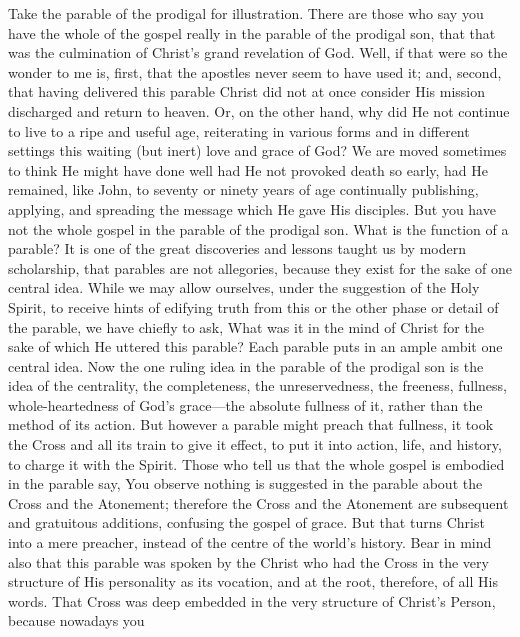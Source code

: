 \documentclass[12pt,a5paper,twoside,titlepage]{book}
\begin{document}
Take the parable of the prodigal for illustration. 
There are those who say you have the 
whole of the gospel really in the parable of the 
prodigal son, that that was the culmination of 
Christ's grand revelation of God. Well, if that 
were so the wonder to me is, first, that the 
apostles never seem to have used it; and, second, 
that having delivered this parable Christ did 
not at once consider His mission discharged and 
return to heaven. Or, on the other hand, why 
did He not continue to live to a ripe and useful 
age, reiterating in various forms and in different 
settings this waiting (but inert) love and grace 
of God? We are moved sometimes to think He 
might have done well had He not provoked 
death so early, had He remained, like John, to 
seventy or ninety years of age continually 
publishing, applying, and spreading the message 
which He gave His disciples. But you have not 
the whole gospel in the parable of the prodigal 
son. What is the function of a parable? It is 
one of the great discoveries and lessons taught 
us by modern scholarship, that parables are not 
allegories, because they exist for the sake of 
one central idea. While we may allow ourselves, 
under the suggestion of the Holy Spirit, 
to receive hints of edifying truth from this or 
the other phase or detail of the parable, we 
have chiefly to ask, What was it in the mind of 
Christ for the sake of which He uttered this 
parable? Each parable puts in an ample ambit 
one central idea. Now the one ruling idea in 
the parable of the prodigal son is the idea of 
the centrality, the completeness, the unreservedness, 
the freeness, fullness, whole-heartedness of 
God's grace---the absolute fullness of it, rather 
than the method of its action. But however a 
parable might preach that fullness, it took the 
Cross and all its train to give it effect, to put it 
into action, life, and history, to charge it with 
the Spirit. Those who tell us that the whole 
gospel is embodied in the parable say, You 
observe nothing is suggested in the parable 
about the Cross and the Atonement; therefore 
the Cross and the Atonement are subsequent 
and gratuitous additions, confusing the gospel 
of grace. But that turns Christ into a mere 
preacher, instead of the centre of the world's 
history. Bear in mind also that this parable was 
spoken by the Christ who had the Cross in the 
very structure of His personality as its vocation, 
and at the root, therefore, of all His words. 
That Cross was deep embedded in the very structure 
of Christ's Person, because nowadays you 
\end{document}
